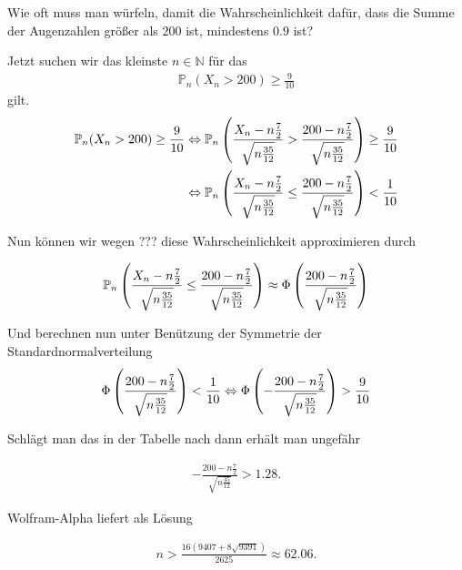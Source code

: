 \begin{exercise}

Wie oft muss man würfeln, damit die Wahrscheinlichkeit dafür, dass die Summe der Augenzahlen größer als $200$ ist, mindestens $0.9$ ist?

\end{exercise}

\begin{solution}

Jetzt suchen wir das kleinste $n \in \mathbb{N}$ für das 
\begin{align*}
    \mathbb{P}_n(X_n > 200) \geq \frac{9}{10}
\end{align*}
gilt. 
\begin{align*}
    \mathbb{P}_n(X_n > 200) \geq \frac{9}{10} &\Leftrightarrow \mathbb{P}_n\left ( \frac{X_n-n\frac{7}{2}}{\sqrt{n\frac{35}{12}}} > \frac{200 -n\frac{7}{2}}{\sqrt{n\frac{35}{12}}} \right ) \geq \frac{9}{10} \\
    &\Leftrightarrow \mathbb{P}_n\left ( \frac{X_n-n\frac{7}{2}}{\sqrt{n\frac{35}{12}}} \leq \frac{200 -n\frac{7}{2}}{\sqrt{n\frac{35}{12}}} \right ) < \frac{1}{10}
\end{align*}

Nun können wir wegen ??? diese Wahrscheinlichkeit approximieren durch

\begin{align*}
    \mathbb{P}_n\left ( \frac{X_n-n\frac{7}{2}}{\sqrt{n\frac{35}{12}}} \leq \frac{200 -n\frac{7}{2}}{\sqrt{n\frac{35}{12}}} \right ) \approx \Phi\left ( \frac{200 -n\frac{7}{2}}{\sqrt{n\frac{35}{12}}} \right )
\end{align*}

Und berechnen nun unter Benützung der Symmetrie der Standardnormalverteilung
\begin{align*}
    \Phi\left ( \frac{200 -n\frac{7}{2}}{\sqrt{n\frac{35}{12}}} \right ) < \frac{1}{10} \Leftrightarrow \Phi\left ( -\frac{200 -n\frac{7}{2}}{\sqrt{n\frac{35}{12}}} \right ) > \frac{9}{10}
\end{align*}

Schlägt man das in der Tabelle nach dann erhält man ungefähr

\begin{align*}
    -\frac{200 -n\frac{7}{2}}{\sqrt{n\frac{35}{12}}} > 1.28.
\end{align*}

Wolfram-Alpha liefert als Lösung

\begin{align*}
    n > \frac{16(9407+8\sqrt{9391})}{2625} \approx 62.06.
\end{align*}

\end{solution}
